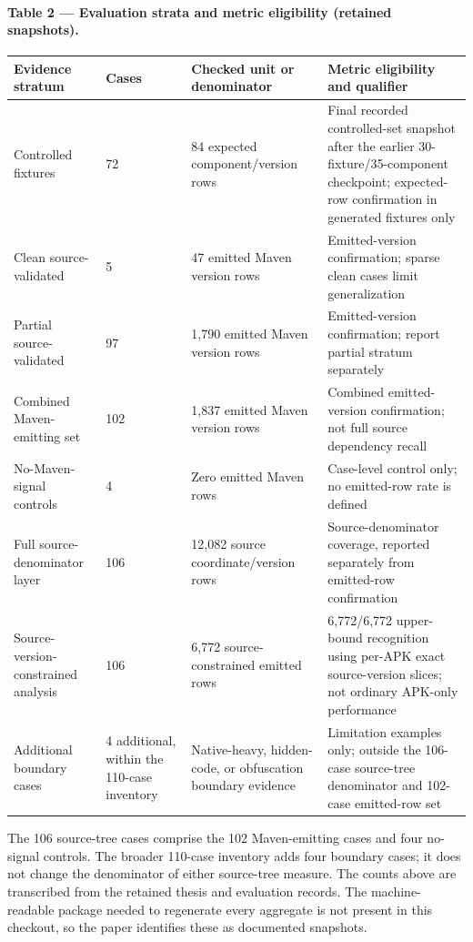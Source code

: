 \documentclass[10pt,twocolumn]{article}
\begin{document}
\paragraph{Table 2 — Evaluation strata and metric eligibility (retained snapshots).}
\begin{center}\small\begin{tabularx}{\columnwidth}{@{}X@{}X@{}X@{}X@{}}
\textbf{Evidence stratum} & \textbf{Cases} & \textbf{Checked unit or denominator} & \textbf{Metric eligibility and qualifier} \\
\midrule
Controlled fixtures & 72 & 84 expected component/version rows & Final recorded controlled-set snapshot after the earlier 30-fixture/35-component checkpoint; expected-row confirmation in generated fixtures only \\
Clean source-validated & 5 & 47 emitted Maven version rows & Emitted-version confirmation; sparse clean cases limit generalization \\
Partial source-validated & 97 & 1,790 emitted Maven version rows & Emitted-version confirmation; report partial stratum separately \\
Combined Maven-emitting set & 102 & 1,837 emitted Maven version rows & Combined emitted-version confirmation; not full source dependency recall \\
No-Maven-signal controls & 4 & Zero emitted Maven rows & Case-level control only; no emitted-row rate is defined \\
Full source-denominator layer & 106 & 12,082 source coordinate/version rows & Source-denominator coverage, reported separately from emitted-row confirmation \\
Source-version-constrained analysis & 106 & 6,772 source-constrained emitted rows & 6,772/6,772 upper-bound recognition using per-APK exact source-version slices; not ordinary APK-only performance \\
Additional boundary cases & 4 additional, within the 110-case inventory & Native-heavy, hidden-code, or obfuscation boundary evidence & Limitation examples only; outside the 106-case source-tree denominator and 102-case emitted-row set \\
\end{tabularx}\end{center}
The 106 source-tree cases comprise the 102 Maven-emitting cases and four no-signal controls. The broader 110-case inventory adds four boundary cases; it does not change the denominator of either source-tree measure. The counts above are transcribed from the retained thesis and evaluation records. The machine-readable package needed to regenerate every aggregate is not present in this checkout, so the paper identifies these as documented snapshots.
\end{document}
